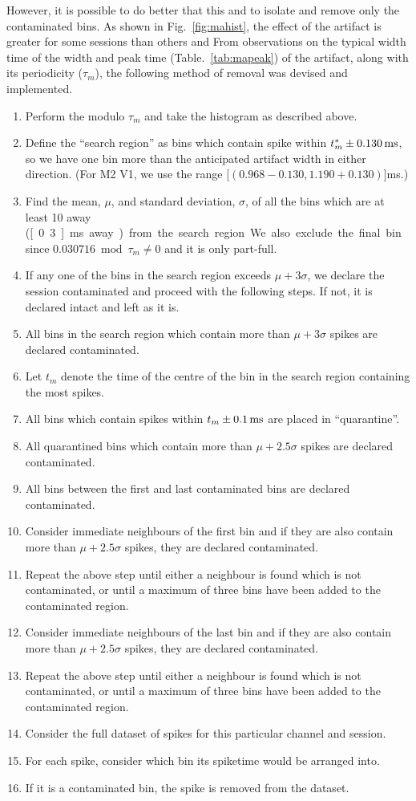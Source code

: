 However, it is possible to do better that this and to isolate and remove only the contaminated bins. As shown in Fig.~\ref{fig:mahist}, the effect of the artifact is greater for some sessions than others and
From observations on the typical width time of the width and peak time (Table.~\ref{tab:mapeak}) of the artifact, along with its periodicity ($\tau_m$), the following method of removal was devised and implemented.
\begin{enumerate}
\item Perform the modulo $\tau_m$ and take the histogram as described above.
\item Define the ``search region'' as bins which contain spike within $t^*_m \pm \unit[0.130]{ms}$, so we have one bin more than the anticipated artifact width in either direction. (For M2 V1, we use the range \unit[$(0.968 - 0.130 , 1.190 + 0.130)$]{ms}.)
\item Find the mean, $\mu$, and standard deviation, $\sigma$, of all the bins which are at least 10 away (\unit[0.3]{ms} away) from the search region. We also exclude the final bin since $0.030716 \bmod \tau_m \neq 0$ and it is only part-full.
\item If any one of the bins in the search region exceeds $\mu + 3 \sigma$, we declare the session contaminated and proceed with the following steps. If not, it is declared intact and left as it is.
\item All bins in the search region which contain more than $\mu + 3 \sigma$ spikes are declared contaminated.
\item Let $t_m$ denote the time of the centre of the bin in the search region containing the most spikes.
\item All bins which contain spikes within $t_m \pm \unit[0.1]{ms}$ are placed in ``quarantine''.
\item All quarantined bins which contain more than $\mu + 2.5 \sigma$ spikes are declared contaminated.
\item All bins between the first and last contaminated bins are declared contaminated.
\item Consider immediate neighbours of the first bin and if they are also contain more than $\mu + 2.5 \sigma$ spikes, they are declared contaminated.
\item Repeat the above step until either a neighbour is found which is not contaminated, or until a maximum of three bins have been added to the contaminated region.
\item Consider immediate neighbours of the last bin and if they are also contain more than $\mu + 2.5 \sigma$ spikes, they are declared contaminated.
\item Repeat the above step until either a neighbour is found which is not contaminated, or until a maximum of three bins have been added to the contaminated region.
\item Consider the full dataset of spikes for this particular channel and session.
\item For each spike, consider which bin its spiketime would be arranged into.
\item If it is a contaminated bin, the spike is removed from the dataset.
\end{enumerate}

